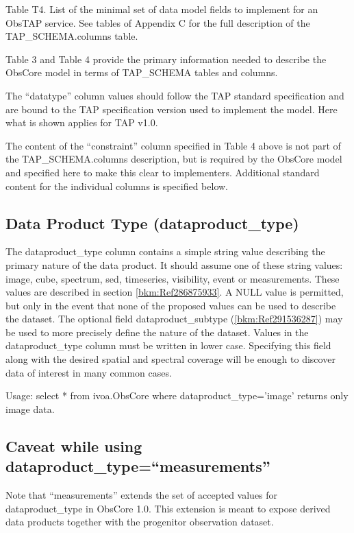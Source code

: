 \documentclass[11pt,a4paper]{ivoa}
\begin{document}
\label{bkm:Ref286578377}Table T4. List of the minimal set of data model fields to
implement for an ObsTAP service. See tables of Appendix C for the full description of the TAP\_SCHEMA.columns table. 

Table 3 and Table 4 provide the primary information needed to describe the ObsCore model in terms of TAP\_SCHEMA tables
and columns. 

The ``datatype'' column values should follow the TAP standard specification and are bound to the TAP specification
version used to implement the model. Here what is shown applies for TAP v1.0. 

The content of the ``constraint'' column specified in Table 4 above is not part of the TAP\_SCHEMA.columns description,
but is required by the ObsCore model and specified here to make this clear to implementers.  Additional standard
content for the individual columns is specified below. 

\subsection{Data Product Type (dataproduct\_type)}
The dataproduct\_type column contains a simple string value describing the primary nature of the data product.  It
should assume one of these string values: image, cube, spectrum, sed, timeseries, visibility, event or measurements. 
These values are described in section \ref{bkm:Ref286875933}.  A NULL value is permitted, but only in the event that
none of the proposed values can be used to describe the dataset.  The optional field dataproduct\_subtype
(\ref{bkm:Ref291536287}) may be used to more precisely define the nature of the dataset.  Values in the
dataproduct\_type column must be written in lower case. Specifying this field along with the desired spatial and
spectral coverage will be enough to discover data of interest in many common cases. 

Usage: select * from ivoa.ObsCore where dataproduct\_type='image' returns only image data.

\subsection{ Caveat while using dataproduct\_type=``measurements''}
Note that ``measurements'' extends the set of accepted values for dataproduct\_type in ObsCore 1.0. This extension is
meant to expose derived data products together with the progenitor observation dataset. 
\end{document}
